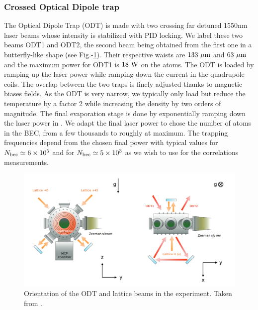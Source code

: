 \subsubsection{Crossed Optical Dipole trap}

The Optical Dipole Trap (ODT) is made with two crossing far detuned 1550nm laser beams whose intensity is stabilized with PID locking. We label these two beams ODT1 and ODT2, the second beam being obtained from the first one in a butterfly-like shape (see Fig.-\ref{fig:scheme_odt_lattice}). Their respective waists are $133 \ \mu \rm{m}$ and $63 \ \mu \rm{m}$ and the maximum power for ODT1 is $18 \ \rm{W}$ on the atoms. The ODT is loaded by ramping up the laser power while ramping down the current in the quadrupole coils. The overlap between the two traps is finely adjusted thanks to magnetic biases fields. As the ODT is very narrow, we typically only load  but reduce the temperature by a factor 2 while increasing the density by two orders of magnitude. The final evaporation stage is done by exponentially ramping down the laser power in . We adapt the final laser power to chose the number of atoms in the BEC, from a few thousands to roughly  at maximum. The trapping frequencies depend from the chosen final power with typical values  for $N_{\rm{bec}} \simeq 6 \times 10^5$ and  for $N_{\rm{bec}} \simeq 5 \times 10^3$ as we wish to use for the \kmk correlations measurements.


\begin{figure}
    \centering
    \includegraphics[width=\textwidth]{Fig/Chapter3/scheme_odt_lattice.png}
    \caption[Orientation of the ODT and lattice beams in the experiment]{Orientation of the ODT and lattice beams in the experiment. Taken from \cite{cayla_these}.}
    \label{fig:scheme_odt_lattice}
\end{figure}

